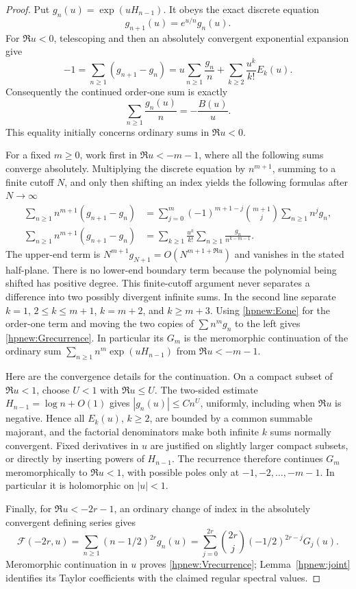 \begin{proof}
Put $g_n(u)=\exp(uH_{n-1})$. It obeys the exact discrete equation
\[
                  g_{n+1}(u)=e^{u/n}g_n(u).
\]
For $\Re u<0$, telescoping and then an absolutely convergent
exponential expansion give
\[
 -1=\sum_{n\ge1}(g_{n+1}-g_n)
   =u\sum_{n\ge1}\frac{g_n}{n}
                      +\sum_{k\ge2}\frac{u^k}{k!}E_k(u).
\]
Consequently the continued order-one sum is exactly
\begin{equation}\label{hpnew:Eone}
                \sum_{n\ge1}\frac{g_n(u)}n=-\frac{B(u)}u.
\end{equation}
This equality initially concerns ordinary sums in $\Re u<0$.

For a fixed $m\ge0$, work first in $\Re u<-m-1$, where all the
following sums converge absolutely. Multiplying the discrete equation
by $n^{m+1}$, summing to a finite cutoff $N$, and only then
shifting an index yields the following formulas after $N\to\infty$
\begin{align*}
 \sum_{n\ge1}n^{m+1}(g_{n+1}-g_n)
 &=\sum_{j=0}^{m}(-1)^{m+1-j}\binom{m+1}{j}
                                  \sum_{n\ge1}n^jg_n,\\
 \sum_{n\ge1}n^{m+1}(g_{n+1}-g_n)
 &=\sum_{k\ge1}\frac{u^k}{k!}
                                  \sum_{n\ge1}\frac{g_n}{n^{k-m-1}}.
\end{align*}
The upper-end term is $N^{m+1}g_{N+1}=O(N^{m+1+\Re u})$ and
vanishes in the stated half-plane. There is no lower-end boundary
term because the polynomial being shifted has positive degree.
This finite-cutoff argument never separates a difference into two
possibly divergent infinite sums. In the second line separate $k=1$,
$2\le k\le m+1$, $k=m+2$, and $k\ge m+3$.
Using \eqref{hpnew:Eone} for the order-one term and moving the two
copies of $\sum n^mg_n$ to the left gives
\eqref{hpnew:Grecurrence}. In particular its $G_m$ is the
meromorphic continuation of the ordinary sum
$\sum_{n\ge1}n^m\exp(uH_{n-1})$ from $\Re u<-m-1$.

Here are the convergence details for the continuation. On a compact
subset of $\Re u<1$, choose $U<1$ with $\Re u\le U$.
The two-sided estimate $H_{n-1}=\log n+O(1)$ gives
$|g_n(u)|\le Cn^U$, uniformly, including when $\Re u$ is negative. Hence all $E_k(u)$, $k\ge2$, are
bounded by a common summable majorant, and the factorial denominators
make both infinite $k$ sums normally convergent. Fixed derivatives in
$u$ are justified on slightly larger compact subsets, or directly by
inserting powers of $H_{n-1}$. The recurrence therefore continues
$G_m$ meromorphically to $\Re u<1$, with possible poles only at
$-1,-2,\ldots,-m-1$. In particular it is holomorphic on $|u|<1$.

Finally, for $\Re u<-2r-1$, an ordinary change of index in the
absolutely convergent defining series gives
\[
 \mathscr F(-2r,u)=\sum_{n\ge1}(n-1/2)^{2r}g_n(u)
   =\sum_{j=0}^{2r}\binom{2r}{j}(-1/2)^{2r-j}G_j(u).
\]
Meromorphic continuation in $u$ proves \eqref{hpnew:Vrecurrence};
Lemma~\ref{hpnew:joint} identifies its Taylor coefficients with the
claimed regular spectral values.
\end{proof}

